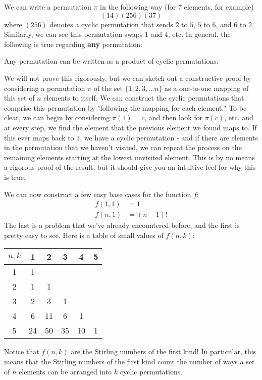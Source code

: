 \begin{remark}[]
We can write a permutation $\pi$ in the following way (for 7 elements, for example) 
\[
	(14) (256) (37)
\]
where $(256)$ denotes a cyclic permutation that sends $2$ to $5$, $5$ to $6$, and $6$ to $2$. Similarly, we can see this permutation swaps $1$ and $4$, etc. In general, the following is true regarding \textbf{any} permutation: 
\begin{theorem}
	Any permutation can be written as a product of cyclic permutations. 
\end{theorem}
We will not prove this rigorously, but we can sketch out a constructive proof by considering a permutation $\pi$ of the set $\{ 1, 2, 3, \ldots n \}$ as a one-to-one mapping of this set of $n$ elements to itself. We can construct the cyclic permutations that comprise this permutation by "following the mapping for each element." To be clear, we can begin by considering $\pi(1) = c$, and then look for $\pi(c)$, etc. and at every step, we find the element that the previous element we found maps to. If this ever maps back to $1$, we have a cyclic permutation - and if there are elements in the permutation that we haven't visited, we can repeat the process on the remaining elements starting at the lowest unvisited element. This is by no means a rigorous proof of the result, but it should give you an intuitive feel for why this is true. 
\end{remark}
We can now construct a few easy base cases for the function $f$: 
\begin{align*}
f(1, 1) &= 1 \\
f(n, 1) &= (n-1)!
\end{align*}
The last is a problem that we've already encountered before, and the first is pretty easy to see. Here is a table of small values of $f(n, k)$: 
\begin{center}
\begin{tabular}{c | c c c c c}
$n, k$ & 1 & 2 & 3 & 4 & 5 \\ \hline 
1 & 1 & & & & \\
2 & 1 & 1 & & &  \\
3 & 2 & 3 & 1 & &  \\
4 & 6 & 11 & 6 & 1 & \\
5 & 24 & 50 & 35 & 10 & 1 \\
\end{tabular}
\end{center}
Notice that $f(n, k)$ are the Stirling numbers of the first kind! In particular, this means that the Stirling numbers of the first kind count the number of ways a set of $n$ elements can be arranged into $k$ cyclic permutations. 

